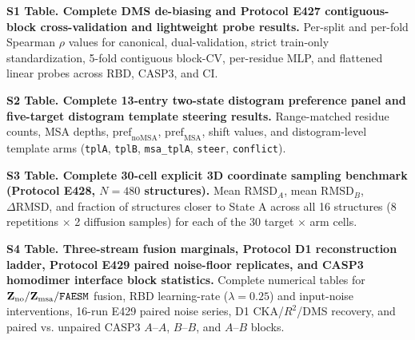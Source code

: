 \documentclass[10pt,a4paper]{article}
\begin{document}
\textbf{S1 Table. Complete DMS de-biasing and Protocol E427 contiguous-block cross-validation and lightweight probe results.}
Per-split and per-fold Spearman $\rho$ values for canonical, dual-validation, strict train-only standardization, 5-fold contiguous block-CV, per-residue MLP, and flattened linear probes across RBD, CASP3, and CI.

\textbf{S2 Table. Complete 13-entry two-state distogram preference panel and five-target distogram template steering results.}
Range-matched residue counts, MSA depths, $\mathrm{pref}_{\mathrm{noMSA}}$, $\mathrm{pref}_{\mathrm{MSA}}$, shift values, and distogram-level template arms (\texttt{tplA}, \texttt{tplB}, \texttt{msa\_tplA}, \texttt{steer}, \texttt{conflict}).

\textbf{S3 Table. Complete 30-cell explicit 3D coordinate sampling benchmark (Protocol E428, $N=480$ structures).}
Mean $\mathrm{RMSD}_A$, mean $\mathrm{RMSD}_B$, $\Delta\mathrm{RMSD}$, and fraction of structures closer to State A across all 16 structures (8 repetitions $\times$ 2 diffusion samples) for each of the 30 target $\times$ arm cells.

\textbf{S4 Table. Three-stream fusion marginals, Protocol D1 reconstruction ladder, Protocol E429 paired noise-floor replicates, and CASP3 homodimer interface block statistics.}
Complete numerical tables for $\mathbf{Z}_{\mathrm{no}} / \mathbf{Z}_{\mathrm{msa}} / \text{\texttt{FAESM}}$ fusion, RBD learning-rate ($\lambda=0.25$) and input-noise interventions, 16-run E429 paired noise series, D1 CKA/$R^2$/DMS recovery, and paired vs. unpaired CASP3 $A\text{--}A$, $B\text{--}B$, and $A\text{--}B$ blocks.
\end{document}
